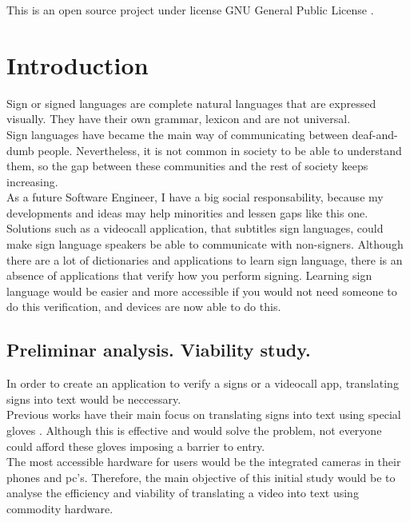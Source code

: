 This is an open source project under license GNU General Public License \cite{gplv3}. \\

\chapter{Introduction}

Sign or signed languages are complete natural languages that are expressed visually.
They have their own grammar, lexicon and are not universal. \\ 

Sign languages have became the main way of communicating between deaf-and-dumb people. Nevertheless,
it is not common in society to be able to understand them, so the gap between these communities
and the rest of society keeps increasing. \\

As a future Software Engineer, I have a big social responsability, because my developments and ideas
may help minorities and lessen gaps like this one. \\

Solutions such as a videocall application, that subtitles sign languages, could make sign language 
speakers be able to communicate with non-signers.
Although there are a lot of dictionaries and applications to learn sign language, there is an 
absence of applications that verify how you perform signing.
Learning sign language would be easier and more accessible if you would not need someone to do this verification,
and devices are now able to do this.

\section{Preliminar analysis. Viability study.}

In order to create an application to verify a signs or a videocall app, 
translating signs into text would be neccessary. \\

Previous works have their main focus on translating signs into text using special gloves \cite{Gloves}. Although this is effective 
and would solve the problem, not everyone could afford these gloves imposing a barrier to entry. \\

The most accessible hardware for users would be the integrated cameras in their phones and pc's. Therefore,
the main objective of this initial study would be to analyse the efficiency and viability of translating 
a video into text using commodity hardware.

